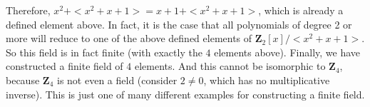 Therefore, $x^2 + <x^2 + x + 1> = x + 1 + <x^2 + x +1>$, which is already a defined element above. In fact, it is the case that all polynomials of degree 2 or more will reduce to one of the above defined elements of $\mathbf{Z}_2[x]/<x^2+x+1>$. So this field is in fact finite (with exactly the $4$ elements above). Finally, we have constructed a finite field of $4$ elements. And this cannot be isomorphic to $\mathbf{Z}_4$, because $\mathbf{Z}_4$ is not even a field (consider $2 \neq 0$, which has no multiplicative inverse). This is just one of many different examples for constructing a finite field. 




